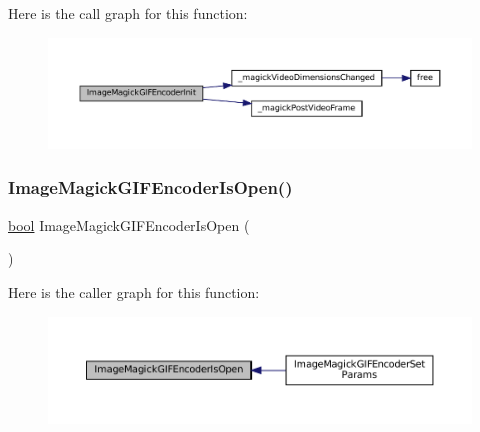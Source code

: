 Here is the call graph for this function\+:
\nopagebreak
\begin{figure}[H]
\begin{center}
\leavevmode
\includegraphics[width=350pt]{imagemagick-gif-encoder_8h_a4e6792b03fca56bec992859842ec4b58_cgraph}
\end{center}
\end{figure}
\mbox{\label{imagemagick-gif-encoder_8h_ab7a661289de539d3a9e6677ea3b45522}} 
\subsubsection{\texorpdfstring{Image\+Magick\+G\+I\+F\+Encoder\+Is\+Open()}{ImageMagickGIFEncoderIsOpen()}}
{\footnotesize\ttfamily \mbox{\hyperlink{libretro_8h_a4a26dcae73fb7e1528214a068aca317e}{bool}} Image\+Magick\+G\+I\+F\+Encoder\+Is\+Open (\begin{DoxyParamCaption}\item[{struct \mbox{\hyperlink{imagemagick-gif-encoder_8h_struct_image_magick_g_i_f_encoder}{Image\+Magick\+G\+I\+F\+Encoder}} $\ast$}]{ }\end{DoxyParamCaption})}

Here is the caller graph for this function\+:
\nopagebreak
\begin{figure}[H]
\begin{center}
\leavevmode
\includegraphics[width=350pt]{imagemagick-gif-encoder_8h_ab7a661289de539d3a9e6677ea3b45522_icgraph}
\end{center}
\end{figure}
\mbox{\label{imagemagick-gif-encoder_8h_aaf05fdd1e4979c7a1fe1894cecf81f11}} 
